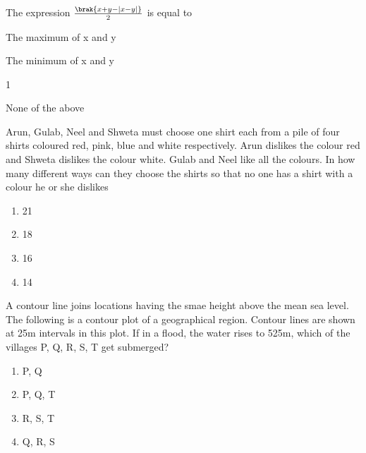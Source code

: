     \item The expression $\frac{\brak{x+y-|x-y|}}{2}$ is equal to  
        \hfill{}
        \begin{enumerate}
                \begin{multicols}{2}
                \item The maximum of x and y
                    \columnbreak
                \item The minimum of x and y
                \end{multicols}
                \begin{multicols}{2}
                \item 1
                    \columnbreak
                \item None of the above
                \end{multicols}
        \end{enumerate}    
    \item Arun, Gulab, Neel and Shweta must choose one shirt each from a pile of four shirts
        coloured red, pink, blue and white respectively. Arun dislikes the colour red and Shweta dislikes
        the colour white. Gulab and Neel like all the colours. In how many different ways can they choose the
        shirts so that no one has a shirt with a colour he or she dislikes
        \hfill{}
        \begin{multicols}{4}
            \begin{enumerate}
                \item 21
                    \columnbreak
                \item 18
                    \columnbreak
                \item 16
                    \columnbreak
                \item 14
            \end{enumerate}
        \end{multicols}
    \item A contour line joins locations having the smae height above the mean sea level. The following
        is a contour plot of a geographical region. Contour lines are shown at 25m intervals in this plot.
        If in a flood, the water rises to 525m, which of the villages P, Q, R, S, T get submerged?
        \hfill{}
        \begin{multicols}{4}
            \begin{enumerate}
                \item P, Q
                    \columnbreak
                \item P, Q, T
                    \columnbreak
                \item R, S, T
                    \columnbreak
                \item Q, R, S
            \end{enumerate}
        \end{multicols}
